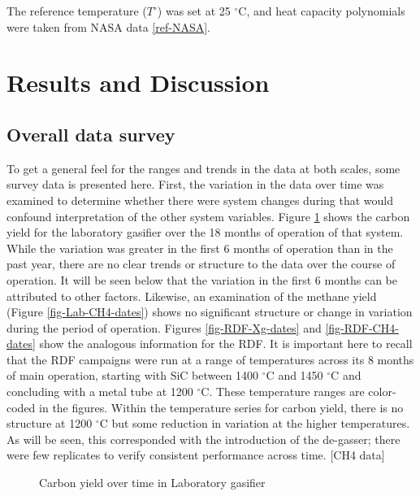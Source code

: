 \documentclass[11pt,twocolumn]{article}
\begin{document}
The reference temperature ($T^{\circ}$) was set at 25 $^{\circ}$C, and heat capacity polynomials were taken from NASA data \ref{ref-NASA}.



\section*{Results and Discussion}

\subsection*{Overall data survey}
To get a general feel for the ranges and trends in the data at both scales, some survey data is presented here.  First, the variation in the data over time was examined to determine whether there were system changes during that would confound interpretation of the other system variables.  Figure \ref{fig-Lab-Xg-dates} shows the carbon yield for the laboratory gasifier over the 18 months of operation of that system.  While the variation was greater in the first 6 months of operation than in the past year, there are no clear trends or structure to the data over the course of operation.  It will be seen below that the variation in the first 6 months can be attributed to other factors.  Likewise, an examination of the methane yield (Figure \ref{fig-Lab-CH4-dates}) shows no significant structure or change in variation during the period of operation.  Figures \ref{fig-RDF-Xg-dates} and \ref{fig-RDF-CH4-dates} show the analogous information for the RDF.  It is important here to recall that the RDF campaigns were run at a range of temperatures across its 8 months of main operation, starting with SiC between 1400 $^{\circ}$C and 1450 $^{\circ}$C and concluding with a metal tube at 1200 $^{\circ}$C.  These temperature ranges are color-coded in the figures.  Within the temperature series for carbon yield, there is no structure at 1200 ${^\circ}$C but some reduction in variation at the higher temperatures.  As will be seen, this corresponded with the introduction of the de-gasser; there were few replicates to verify consistent performance across time. [CH4 data]
\begin{figure}[hp]

\caption{Carbon yield over time in Laboratory gasifier}
\label{fig-Lab-Xg-dates}
\end{figure}
\end{document}
